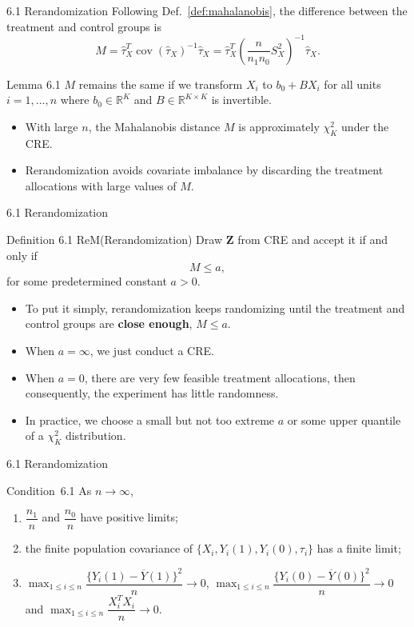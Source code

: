 \documentclass[aspectratio=169, 12pt]{beamer}
\begin{document}
\begin{frame}[label=lemma-6-1]{6.1 Rerandomization}
  Following Def.~\ref{def:mahalanobis}, the difference between the treatment and control groups is 
  \[
  M 
  = \widehat{\tau}_X^T\operatorname{cov}(\widehat{\tau}_X)^{-1}\widehat{\tau}_X 
  = \widehat{\tau}_X^T\left(\frac{n}{n_1n_0}S_X^2\right)^{-1}\widehat{\tau}_X.
  \]
  \begin{keybox}{Lemma 6.1}
    $M$ remains the same if we transform $X_i$ to $b_0+BX_i$ for all units $i=1,\dots,n$ where $b_0\in \mathbb{R}^K$ and $B\in\mathbb{R}^{K\times K}$ is invertible.
    \label{lemma1}
    \vfill
    \hfill\hyperlink{pr-lemma-6-1<1>}{}
  \end{keybox}
  \begin{itemize}
    \item With large $n$, the Mahalanobis distance $M$ is approximately $\chi_K^2$ under the CRE.
    \item Rerandomization avoids covariate imbalance by discarding the treatment allocations with large values of $M$.
  \end{itemize}
\end{frame}

\begin{frame}{6.1 Rerandomization}
  \begin{keybox}{Definition 6.1 ReM(Rerandomization)}
    Draw $\bm{Z}$ from CRE and accept it if and only if 
    \[
    M \leq a,
    \]
    for some predetermined constant $a>0$.
  \end{keybox}
  \begin{itemize}
    \item To put it simply, rerandomization keeps randomizing until the treatment and control groups are \textbf{close enough}, $M \le a$.
    \item When $a=\infty$, we just conduct a CRE.
    \item When $a=0$, there are very few feasible treatment allocations, then consequently, the experiment has little randomness.
    \item In practice, we choose a small but not too extreme $a$ or some upper quantile of a $\chi_K^2$ distribution.
  \end{itemize}
\end{frame}

\begin{frame}{6.1 Rerandomization}
  \begin{keybox}{Condition~6.1}
    As $n\to \infty$,
    \begin{enumerate}
      \item $\dfrac{n_1}{n}$ and $\dfrac{n_0}{n}$ have positive limits;
      \item the finite population covariance of $\{X_i, Y_i(1), Y_i(0), \tau_i\}$ has a finite limit;
      \item $\max_{1\leq i \leq n}\dfrac{\{Y_i(1)-\overline{Y}(1)\}^2}{n}\to 0$, $\max_{1\leq i\leq n}\dfrac{\{Y_i(0)-\overline{Y}(0)\}^2}{n}\to 0$ and $\max_{1 \leq i \leq n}\dfrac{X_i^TX_i}{n}\to 0$.
    \end{enumerate}
    \label{condition1:reg_cond}
  \end{keybox}
\end{frame}
\end{document}
